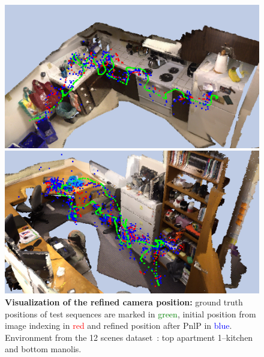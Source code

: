 \begin{figure}
    \centering

	\includegraphics[width=\linewidth]{results/models/kitchen}
	
	\includegraphics[width=\linewidth]{results/models/manolis}
	
	\caption[Refined position visualization -- 3]{\label{fig:res_visualization_gene}\textbf{Visualization of the refined camera position:} ground truth positions of test sequences are marked in \textcolor{green}{green}, initial position from image indexing in \textcolor{red}{red} and refined position after PnlP in \textcolor{blue}{blue}. Environment from the 12 scenes dataset~\citep{Valentin2016}: top apartment 1--kitchen and bottom manolis.}
	
\end{figure}